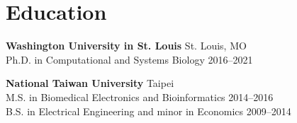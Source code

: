 \section{Education}

\begin{entrylist}

\item \textbf{Washington University in St. Louis} \hfill
    St. Louis, MO\\
    Ph.D. in Computational and Systems Biology \hfill
    2016--2021

\item \textbf{National Taiwan University} \hfill
    Taipei\\
    M.S. in Biomedical Electronics and Bioinformatics \hfill
    2014--2016\\
    B.S. in Electrical Engineering and minor in Economics \hfill
    2009--2014

\end{entrylist}
